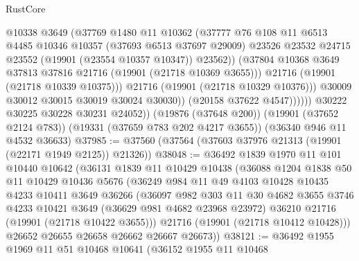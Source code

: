 \begin{lexlean}{RustCore}
\begin{coremodule}
                          @10338
                          @3649
                          (@37769
                            @1480
                            @11
                            @10362
                            (@37777
                              @76
                              @108
                              @11
                              @6513
                              @4485
                              @10346
                              @10357
                              (@37693 @6513 @37697 @29009)
                              @23526
                              @23532
                              @24715
                              @23552
                              (@19901 (@23554 @10357 @10347))
                              @23562))
                          (@37804 @10368 @3649 @37813 @37816 @21716 (@19901 (@21718 @10369 @3655)))
                          @21716
                          (@19901 (@21718 @10339 @10375)))
                        @21716
                        (@19901 (@21718 @10329 @10376)))
                      @30009
                      @30012
                      @30015
                      @30019
                      @30024
                      @30030))
                  (@20158 @37622 @4547))))))
        @30222
        @30225
        @30228
        @30231
        @24052))
    (@19876 (@37648 @200))
    (@19901 (@37652 @2124 @783))
    (@19331 (@37659 @783 @202 @4217 @3655))
    (@36340 @946 @11 @4532 @36633)
@37985 := @37560 (@37564 (@37603 @37976 @21313 (@19901 (@22171 @1949 @2125)) @21326))
@38048 := @36492
    @1839
    @1970
    @11
    @101
    @10440
    @10642
    (@36131
      @1839
      @11
      @10429
      @10438
      (@36088
        @1204
        @1838
        @50
        @11
        @10429
        @10436
        @5676
        (@36249
          @984
          @11
          @49
          @4103
          @10428
          @10435
          @4233
          @10411
          @3649
          @36266
          (@36097
            @982
            @303
            @11
            @30
            @4682
            @3655
            @3746
            @4233
            @10421
            @3649
            (@36629 @981 @4682 @23968 @23972)
            @36210
            @21716
            (@19901 (@21718 @10422 @3655)))
          @21716
          (@19901 (@21718 @10412 @10428)))
        @26652
        @26655
        @26658
        @26662
        @26667
        @26673))
@38121 := @36492
    @1955
    @1969
    @11
    @51
    @10468
    @10641
    (@36152
      @1955
      @11
      @10468

\end{coremodule}
\end{lexlean}

